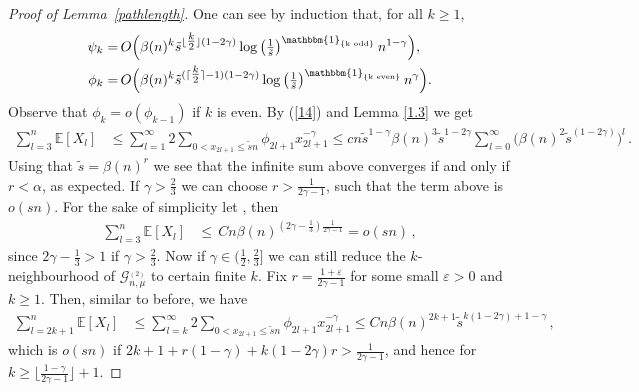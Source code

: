 \documentclass[12pt,a4paper]{article}
\numberwithin{equation}{section}
\begin{document}
\begin{proof}[Proof of Lemma~\ref{pathlength}]
One can see by induction that, for all $k\ge1$,
\begin{equation}
\begin{aligned} \label{15}
   \psi_k =&\,O\Big(\beta(n)^{k}\tilde s ^{\lfloor \tfrac{k}{2}\rfloor(1-2\gamma)} \log\left(\tfrac{1}{\tilde s}\right)^{\mathbbm{1}_{\{\text{k odd}\}}} n^{1-\gamma} \Big), \\
    \phi_k =&\,O\Big(\beta(n)^{k}\tilde s ^{( \lceil \tfrac{k}{2}\rceil -1)(1-2\gamma)} \log\left(\tfrac{1}{\tilde s}\right)^{\mathbbm{1}_{\{\text{k even}\}}} n^{\gamma}  \Big) .
\end{aligned}    
\end{equation}
Observe that $\phi_k=o(\phi_{k-1})$ if $k$ is even. 
By (\ref{14}) and Lemma \ref{1.3} we get
\begin{align*}
    \sum_{l=3}^n \mathbb{E}[X_l] &\le \sum_{l=1}^\infty 2\sum_{0<x_{2l+1}\le \tilde s n} \phi_{2l+1} x_{2l+1}^{-\gamma}
    \le c n  \tilde s^{1-\gamma}\beta(n)^3 \tilde s ^{1-2\gamma}\sum_{l=0}^\infty \big( \beta(n)^{2 }\tilde s ^{(1-2\gamma)}\big)^l\,.
\end{align*}
Using that $\tilde s = \beta(n)^r$ we see that the infinite sum above converges if and only if $r<\alpha$, as %
expected. If $\gamma>\tfrac23$ we can choose $r>\tfrac{1}{2\gamma-1}$, such that the term above is~$o(sn)$. For the sake of simplicity let , then 
\begin{align*}
     \sum_{l=3}^n \mathbb{E}[X_l] &\le  \,C n \beta(n)^{(2\gamma-\tfrac13)\tfrac{1}{2\gamma-1}} = o(sn)\,,
\end{align*}
since $2\gamma-\tfrac13>1$ if $\gamma>\tfrac23$. Now if $\gamma\in(\tfrac12,\tfrac23]$ we can still reduce the $k$-neighbourhood of $\mathcal G^{_{(2)}}_{n,\mu}$ to certain finite $k$. Fix $r=\tfrac{1+\varepsilon}{2\gamma-1}$ for some small $\varepsilon>0$ and $k\ge1$. Then, similar to before, we have 
\begin{align*}
     \sum_{l=2k+1}^n \mathbb{E}[X_l] &\le \sum_{l=k}^\infty 2\sum_{0<x_{2l+1}\le \tilde s n} \phi_{2l+1} x_{2l+1}^{-\gamma}
     \le C n  \beta(n)^{2k+1} \tilde s ^{k(1-2\gamma)+1-\gamma} \,,
\end{align*}
which is $o(sn)$ if %
    $2k+1+r(1-\gamma)+k(1-2\gamma)r>\tfrac{1}{2\gamma-1}$,
and hence for $k\ge \lfloor\frac{1-\gamma}{2\gamma-1}\rfloor +1$.%
\smallskip%


\end{proof}
\end{document}
